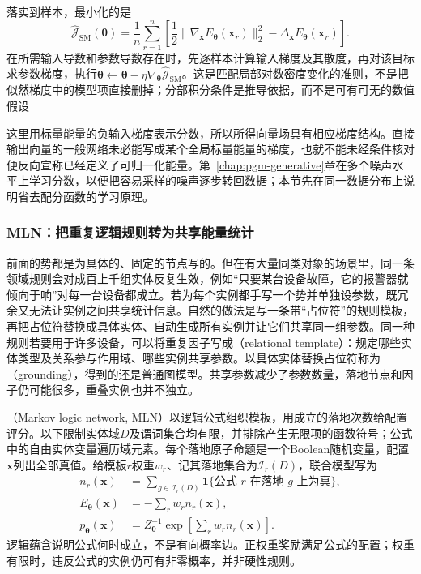 落实到样本，最小化的是
\begin{equation}
  \widehat{\mathcal{J}}_{\mathrm{SM}}(\bm{\theta})
   =\frac1n\sum_{r=1}^n\left[
       \frac12\lVert\nabla_{\bm{x}}E_{\bm{\theta}}(\bm{x}_r)\rVert_2^2
       -\Delta_{\bm{x}}E_{\bm{\theta}}(\bm{x}_r)\right].
  \label{eq:pgm-energy-models-score-matching}
\end{equation}
在所需输入导数和参数导数存在时，先逐样本计算输入梯度及其散度，再对该目标求参数梯度，执行$\bm{\theta}\leftarrow\bm{\theta}-\eta\nabla_{\bm{\theta}}\widehat{\mathcal{J}}_{\mathrm{SM}}$。这是匹配局部对数密度变化的准则，不是把似然梯度中的模型项直接删掉；分部积分条件是推导依据，而不是可有可无的数值假设

这里用标量能量的负输入梯度表示分数，所以所得向量场具有相应梯度结构。直接输出向量的一般网络未必能写成某个全局标量能量的梯度，也就不能未经条件核对便反向宣称已经定义了可归一化能量。第~\ref{chap:pgm-generative}章在多个噪声水平上学习分数，以便把容易采样的噪声逐步转回数据；本节先在同一数据分布上说明省去配分函数的学习原理。

\subsubsection{MLN：把重复逻辑规则转为共享能量统计}
\label{sec:pgm-energy-models-mln}

前面的势都是为具体的、固定的节点写的。但在有大量同类对象的场景里，同一条领域规则会对成百上千组实体反复生效，例如“只要某台设备故障，它的报警器就倾向于响”对每一台设备都成立。若为每个实例都手写一个势并单独设参数，既冗余又无法让实例之间共享统计信息。自然的做法是写一条带“占位符”的规则模板，再把占位符替换成具体实体、自动生成所有实例并让它们共享同一组参数。同一种规则若要用于许多设备，可以将重复因子写成（relational template）：规定哪些实体类型及关系参与作用域、哪些实例共享参数。以具体实体替换占位符称为（grounding），得到的还是普通图模型。共享参数减少了参数数量，落地节点和因子仍可能很多，重叠实例也并不独立。

（Markov logic network, MLN）以逻辑公式组织模板，用成立的落地次数给配置评分。以下限制实体域$D$及谓词集合均有限，并排除产生无限项的函数符号；公式中的自由实体变量遍历域元素。每个落地原子命题是一个Boolean随机变量，配置$\bm{x}$列出全部真值。给模板$r$权重$w_r$、记其落地集合为$\mathcal{I}_r(D)$，联合模型写为
\begin{equation}
  \begin{aligned}
    n_r(\bm{x})
      &=\sum_{g\in\mathcal{I}_r(D)}
           \mathbf{1}\{\text{公式 }r\text{ 在落地 }g\text{ 上为真}\},\\
    E_{\bm{\theta}}(\bm{x})&=-\sum_rw_rn_r(\bm{x}),\\
    p_{\bm{\theta}}(\bm{x})
      &=Z_{\bm{\theta}}^{-1}
          \exp\!\left[\sum_rw_rn_r(\bm{x})\right].
  \end{aligned}
  \label{eq:pgm-energy-models-mln}
\end{equation}
逻辑蕴含说明公式何时成立，不是有向概率边。正权重奖励满足公式的配置；权重有限时，违反公式的实例仍可有非零概率，并非硬性规则。

